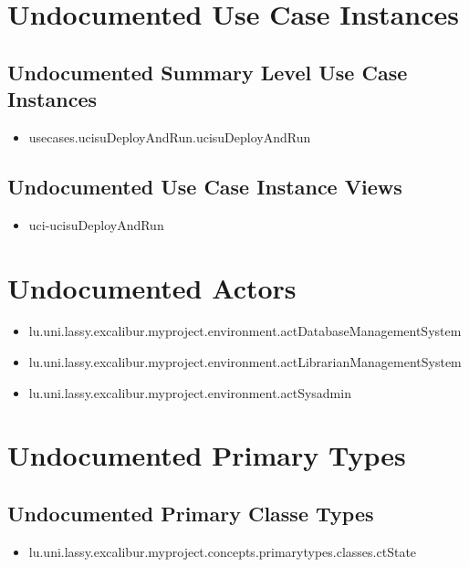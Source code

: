 \section[Undocumented Use Case Instances]{Undocumented Use Case Instances}

\subsection[Undocumented Use Case Instances - Summary Level]{Undocumented Summary Level Use Case Instances}
\begin{itemize}
\item usecases.ucisuDeployAndRun.ucisuDeployAndRun 
\end{itemize}



\subsection[Undocumented Use Case Instance Views]{Undocumented Use Case Instance Views}
\begin{itemize}
\item uci-ucisuDeployAndRun 
\end{itemize}


\section[Undocumented Actors]{Undocumented Actors}
\begin{itemize}
\item lu.uni.lassy.excalibur.myproject.environment.actDatabaseManagementSystem 
\item lu.uni.lassy.excalibur.myproject.environment.actLibrarianManagementSystem 
\item lu.uni.lassy.excalibur.myproject.environment.actSysadmin 
\end{itemize}




\section[Undocumented Primary Types]{Undocumented Primary Types}

\subsection[Undocumented Primary Classe Types]{Undocumented Primary Classe Types}
\begin{itemize}
\item lu.uni.lassy.excalibur.myproject.concepts.primarytypes.classes.ctState 
\end{itemize}

























